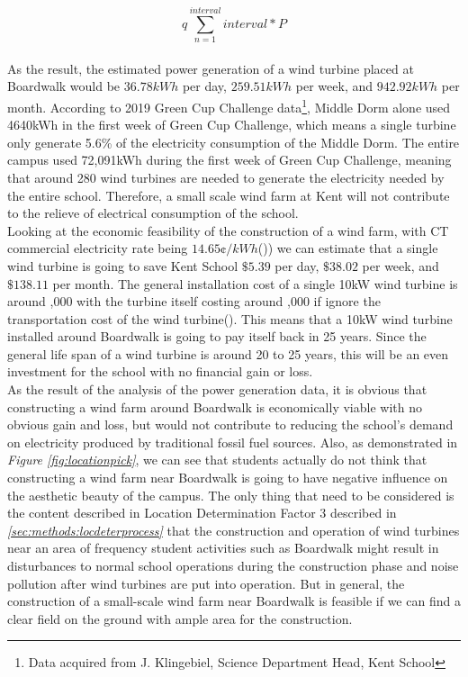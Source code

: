 \documentclass[review]{elsarticle}
\begin{document}
\begin{equation}q
    \label{equ:windenergy}
    \sum_{n=1}^{interval} interval*P
\end{equation}
\\\indent As the result, the estimated power generation of a wind turbine placed at Boardwalk would be $36.78kWh$ per day, $259.51kWh$ per week, and $942.92kWh$ per month. According to 2019 Green Cup Challenge data\footnote{Data acquired from J. Klingebiel, Science Department Head, Kent School}, Middle Dorm 
alone used 4640kWh in the first week of Green Cup Challenge, which means a single turbine only generate 5.6\% of the electricity consumption of the Middle Dorm. The entire campus used 72,091kWh during the first week of 
Green Cup Challenge, meaning that around 280 wind turbines are needed to generate the electricity needed by the entire school. Therefore, a small scale wind farm at Kent will not contribute to the relieve of electrical 
consumption of the school. 
\\\indent Looking at the economic feasibility of the construction of a wind farm, with CT commercial electricity rate being $14.65\cent/kWh$()\cite{u.s._energy_information_administration_2019}) we can estimate that a single wind turbine is going to save Kent School $\mathdollar5.39$ 
per day, $\mathdollar38.02$ per week, and $\mathdollar138.11$ per month. The general installation cost of a single 10kW wind turbine is around ,000 with the turbine itself 
costing around ,000 if ignore the transportation cost of the wind turbine(\cite{bergey_wind_power}). This means that a 10kW wind turbine installed around Boardwalk is going to pay itself back in 25 years. Since the general life span of a wind turbine is around 20 to 25 years, 
this will be an even investment for the school with no financial gain or loss.
\\\indent As the result of the analysis of the power generation data, it is obvious that constructing a wind farm around Boardwalk is economically viable with no obvious gain and loss, but would not contribute to reducing the school's 
demand on electricity produced by traditional fossil fuel sources. Also, as demonstrated in \textit{Figure \ref{fig:locationpick}}, we can see that students actually do not think that constructing a wind farm near Boardwalk is going to 
have negative influence on the aesthetic beauty of the campus. The only thing that need to be considered is the content described in Location Determination Factor 3 described in \textit{\ref{sec:methods:locdeterprocess}} that the construction 
and operation of wind turbines near an area of frequency student activities such as Boardwalk might result in disturbances to normal school operations during the construction phase and noise pollution after wind turbines are put into 
operation. But in general, the construction of a small-scale wind farm near Boardwalk is feasible if we can find a clear field on the ground with ample area for the construction.
\end{document}

